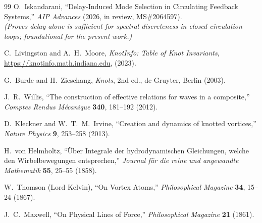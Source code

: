 \documentclass[11pt,a4paper]{article}
\begin{document}
\begin{thebibliography}{99}
O.\ Iskandarani,
``Delay-Induced Mode Selection in Circulating Feedback Systems,''
\textit{AIP Advances} (2026, in review, MS\#2064597).\\
\textit{(Proves delay alone is sufficient for spectral discreteness in
closed circulation loops; foundational for the present work.)}

C.\ Livingston and A.\ H.\ Moore,
\textit{KnotInfo: Table of Knot Invariants},
\url{https://knotinfo.math.indiana.edu}, (2023).

G.\ Burde and H.\ Zieschang,
\textit{Knots}, 2nd ed., de Gruyter, Berlin (2003).

J.\ R.\ Willis,
``The construction of effective relations for waves in a composite,''
\textit{Comptes Rendus M\'ecanique} \textbf{340}, 181--192 (2012).

D.\ Kleckner and W.\ T.\ M.\ Irvine,
``Creation and dynamics of knotted vortices,''
\textit{Nature Physics} \textbf{9}, 253--258 (2013).

H.\ von Helmholtz,
``{\"U}ber Integrale der hydrodynamischen Gleichungen, welche den
Wirbelbewegungen entsprechen,''
\textit{Journal f{\"u}r die reine und angewandte Mathematik} \textbf{55},
25--55 (1858).

W.\ Thomson (Lord Kelvin),
``On Vortex Atoms,''
\textit{Philosophical Magazine} \textbf{34}, 15--24 (1867).

J.\ C.\ Maxwell,
``On Physical Lines of Force,''
\textit{Philosophical Magazine} \textbf{21} (1861).

\end{thebibliography}
\end{document}

